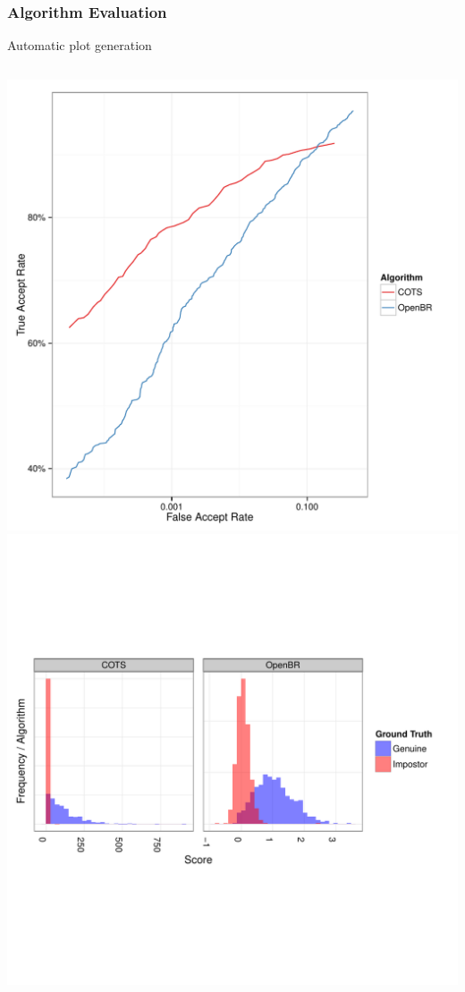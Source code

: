 \documentclass[12pt]{beamer}
\begin{document}
\begin{frame}
\frametitle{Algorithm Evaluation}
\begin{block}{Automatic plot generation}
\begin{columns}
    \includegraphics[width=\textwidth]{img/MEDS/MEDS_ROC}
    \includegraphics[width=\textwidth]{img/MEDS/MEDS_SD}

\end{columns}
\end{block}
\end{frame}
\end{document}
